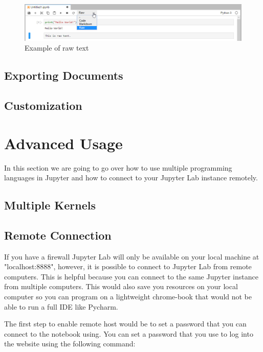 \documentclass[pdftex,12pt]{artikel3}
\begin{document}
\begin{figure}[h!]
    \centering
    \includegraphics[width=15cm]{raw_text_example.png}
    \caption{Example of raw text}
    \label{fig:rawtextexample}
\end{figure}

\subsection{Exporting Documents}

\subsection{Customization}

\section{Advanced Usage}

In this section we are going to go over how to use multiple programming languages in Jupyter and how to connect to your Jupyter Lab instance remotely.

\subsection{Multiple Kernels}

\subsection{Remote Connection}

If you have a firewall Jupyter Lab will only be available on your
local machine at "localhost:8888", however, it is possible to connect to Jupyter Lab from remote computers. 
This is helpful because you can connect to the same Jupyter instance from multiple computers. This would also save you resources on your local computer so you can program on a lightweight chrome-book that would not be able to run a full IDE like Pycharm.

The first step to enable remote host would be to set a password that you can connect to the notebook using. You can set a password that you use to log into the website using the following command:
\end{document}

